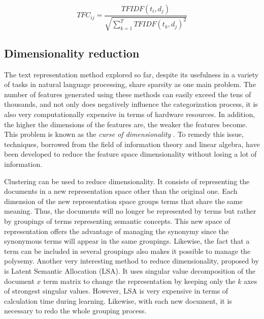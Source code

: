 $$T F C _ { i j } = \frac { T F I D F \left( t _ { i } , d _ { j } \right) } { \sqrt { \sum _ { k = 1 } ^ { T } T F I D F \left( t _ { k } , d _ { j } \right) ^ { 2 } } }$$

\subsection{Dimensionality reduction}

The text representation method explored so far, despite its usefulness in a variety of tasks in natural language processing, share sparsity as one main problem. The number of features generated using these methods can easily exceed the tens of thousands, and not only does negatively influence the categorization process, it is also very computationally expensive in terms of hardware resources. In addition, the higher the dimensions of the features are, the weaker the features become. This problem is known as the \emph{curse of dimensionality} \citep{bellman2015adaptive}. To remedy this issue,  techniques, borrowed from the field of information theory and linear algebra, have been developed to reduce the feature space dimensionality without losing a lot of information. 


Clustering \citep{baker1998distributional} \citep{sable2001using} \citep{slonim2001power} can be used to reduce dimensionality. It consists of representing the documents in a new representation space other than the original one. Each dimension of the new representation space groups terms that share the same meaning. Thus, the documents will no longer be represented by terms but rather by groupings of terms representing semantic concepts. This new space of representation offers the advantage of managing the synonymy since the synonymous terms will appear in the same groupings. Likewise, the fact that a term can be included in several groupings also makes it possible to manage the polysemy. Another very interesting method to reduce dimensionality, proposed by \citep{deerwester1990indexing} is Latent Semantic Allocation (LSA). It uses singular value decomposition of the document $x$ term matrix to change the representation by keeping only the $k$ axes of strongest singular values. However, LSA is very expensive in terms of calculation time during learning. Likewise, with each new document, it is necessary to redo the whole grouping process.

